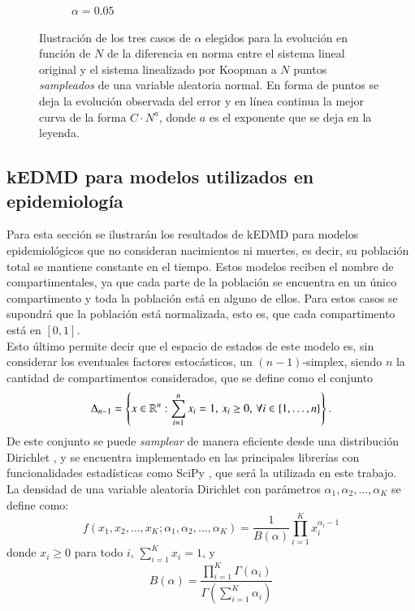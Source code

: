 \begin{figure}[h]
\begin{subfigure}[b]{0.32\textwidth}
        \caption{$\alpha=0.05$}
        \label{fig:image3}
    \end{subfigure}
    \caption{Ilustración de los tres casos de $\alpha$ elegidos para la evolución en función de $N$ de la diferencia en norma entre el sistema lineal original y el sistema linealizado por Koopman a $N$ puntos \textit{sampleados} de una variable aleatoria normal. En forma de puntos se deja la evolución observada del error y en línea continua la mejor curva de la forma $C \cdot N^{a}$, donde $a$ es el exponente que se deja en la leyenda.}
    \label{fig:ErrorLin}
\end{figure}
\subsection{kEDMD para modelos utilizados en epidemiología}
Para esta sección se ilustrarán los resultados de kEDMD para modelos epidemiológicos que no consideran nacimientos ni muertes, es decir, su población total se mantiene constante en el tiempo. Estos modelos reciben el nombre de compartimentales, ya que cada parte de la población se encuentra en un único compartimento y toda la población está en alguno de ellos. Para estos casos se supondrá que la población está normalizada, esto es, que cada compartimento está en $[0, 1]$.\\
Esto último permite decir que el espacio de estados de este modelo es, sin considerar los eventuales factores estocásticos, un $(n-1)$-simplex, siendo $n$ la cantidad de compartimentos considerados, que se define como el conjunto
\begin{equation*}
    \Delta_{n-1} = \left \{ x \in \mathbb{R}^n : \sum_{i=1}^n x_i = 1, \, x_i \geq 0, \, \forall i \in \{1, \dots, n\} \right \}.
\end{equation*}
De este conjunto se puede \textit{samplear} de manera eficiente desde una distribución Dirichlet \cite{Frigyik2010IntroductionProcesses}, y se encuentra implementado en las principales librerías con funcionalidades estadísticas como SciPy \cite{Virtanen2020SciPyPython}, que será la utilizada en este trabajo.\\
La densidad de una variable aleatoria Dirichlet con parámetros $\alpha_1, \alpha_2, \ldots, \alpha_K$ se define como:
\[
f(x_1, x_2, \ldots, x_K; \alpha_1, \alpha_2, \ldots, \alpha_K) = \frac{1}{B(\alpha)} \prod_{i=1}^{K} x_i^{\alpha_i - 1}
\]
donde $x_i \geq 0$ para todo $i$, $\sum_{i=1}^{K} x_i = 1$, y
\[
B(\alpha) = \frac{\prod_{i=1}^{K} \Gamma(\alpha_i)}{\Gamma\left(\sum_{i=1}^{K} \alpha_i\right)}
\]
